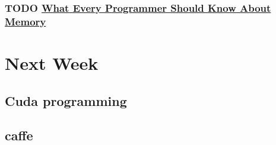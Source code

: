\documentclass[11pt]{article}
\begin{document}
\subsubsection{{\bfseries\sffamily TODO} \href{file:///Users/zhangli/Documents/Library.papers3/Files/1E/1ED49076-5D40-4E5F-B232-918B17EA1596.pdf}{What Every Programmer Should Know About Memory}}
\label{sec:orgheadline15}

\section{Next Week}
\label{sec:orgheadline20}
\subsection{Cuda programming}
\label{sec:orgheadline18}
\subsection{caffe}
\label{sec:orgheadline19}
\end{document}
